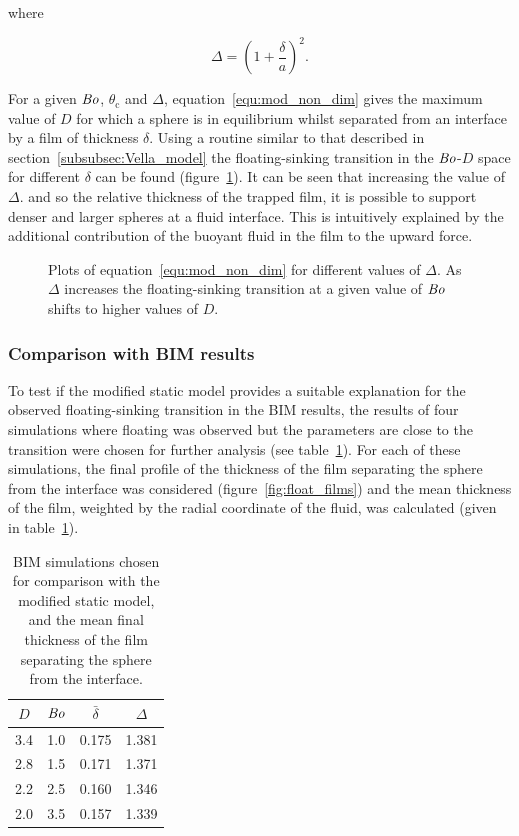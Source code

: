 \documentclass[12pt]{article}
\newcommand\Bo{\mbox{\textit{Bo}}}  %
\begin{document}
where

\begin{equation}
\label{equ:non_dim_film}
\Delta = \left(1 + \frac{\delta}{a}\right)^{2}.
\end{equation}

For a given $\Bo$, $\theta_{\text{c}}$ and $\Delta$, equation~\ref{equ:mod_non_dim} gives the maximum value of $D$ for which a sphere is in equilibrium whilst separated from an interface by a film of thickness $\delta$. Using a routine similar to that described in section~\ref{subsubsec:Vella_model} the floating-sinking transition in the $\Bo$-$D$ space for different $\delta$ can be found (figure~\ref{fig:Delta_trans}). It can be seen that increasing the value of $\Delta$. and so the relative thickness of the trapped film, it is possible to support denser and larger spheres at a fluid interface. This is intuitively explained by the additional contribution of the buoyant fluid in the film to the upward force.

  \begin{figure}
    \resizebox{0.9\textwidth}{!}{\large }
    \caption{Plots of equation~\ref{equ:mod_non_dim} for different values of $\Delta$. As $\Delta$ increases the floating-sinking transition at a given value of $\Bo$ shifts to higher values of $D$. \label{fig:Delta_trans}}
  \end{figure}

\subsubsection{Comparison with BIM results}
\label{subsubsection:mod_comp_bim}

To test if the modified static model provides a suitable explanation for the observed floating-sinking transition in the BIM results, the results of four simulations where floating was observed but the parameters are close to the transition were chosen for further analysis (see table~\ref{tab:film_sims}). For each of these simulations, the final profile of the thickness of the film separating the sphere from the interface was considered (figure~\ref{fig:float_films}) and the mean thickness of the film, weighted by the radial coordinate of the fluid, was calculated (given in table~\ref{tab:film_sims}).

\begin{longtable}{|c|c|c|c|}
  \caption{BIM simulations chosen for comparison with the modified static model, and the mean final thickness of the film separating the sphere from the interface. \label{tab:film_sims}} \\ %
  \hline
$D$ & $\Bo$ & $\bar{\delta}$ & $\Delta$ \\
  \hline %
  3.4 & 1.0 & 0.175 & 1.381 \\
  2.8 & 1.5 & 0.171 & 1.371 \\
  2.2 & 2.5 & 0.160 & 1.346 \\
  2.0 & 3.5 & 0.157 & 1.339 \\
  \hline
\end{longtable}
\end{document}
